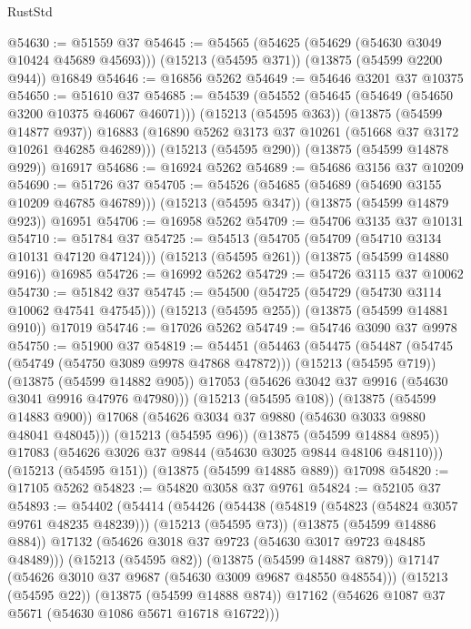 \begin{lexlean}{RustStd}
\begin{coremodule}
@54630 := @51559 @37
@54645 := @54565
    (@54625 (@54629 (@54630 @3049 @10424 @45689 @45693)))
    (@15213 (@54595 @371))
    (@13875 (@54599 @2200 @944))
    @16849
@54646 := @16856 @5262
@54649 := @54646 @3201 @37 @10375
@54650 := @51610 @37
@54685 := @54539
    (@54552
      (@54645 (@54649 (@54650 @3200 @10375 @46067 @46071)))
      (@15213 (@54595 @363))
      (@13875 (@54599 @14877 @937))
      @16883
      (@16890 @5262 @3173 @37 @10261 (@51668 @37 @3172 @10261 @46285 @46289)))
    (@15213 (@54595 @290))
    (@13875 (@54599 @14878 @929))
    @16917
@54686 := @16924 @5262
@54689 := @54686 @3156 @37 @10209
@54690 := @51726 @37
@54705 := @54526
    (@54685 (@54689 (@54690 @3155 @10209 @46785 @46789)))
    (@15213 (@54595 @347))
    (@13875 (@54599 @14879 @923))
    @16951
@54706 := @16958 @5262
@54709 := @54706 @3135 @37 @10131
@54710 := @51784 @37
@54725 := @54513
    (@54705 (@54709 (@54710 @3134 @10131 @47120 @47124)))
    (@15213 (@54595 @261))
    (@13875 (@54599 @14880 @916))
    @16985
@54726 := @16992 @5262
@54729 := @54726 @3115 @37 @10062
@54730 := @51842 @37
@54745 := @54500
    (@54725 (@54729 (@54730 @3114 @10062 @47541 @47545)))
    (@15213 (@54595 @255))
    (@13875 (@54599 @14881 @910))
    @17019
@54746 := @17026 @5262
@54749 := @54746 @3090 @37 @9978
@54750 := @51900 @37
@54819 := @54451
    (@54463
      (@54475
        (@54487
          (@54745 (@54749 (@54750 @3089 @9978 @47868 @47872)))
          (@15213 (@54595 @719))
          (@13875 (@54599 @14882 @905))
          @17053
          (@54626 @3042 @37 @9916 (@54630 @3041 @9916 @47976 @47980)))
        (@15213 (@54595 @108))
        (@13875 (@54599 @14883 @900))
        @17068
        (@54626 @3034 @37 @9880 (@54630 @3033 @9880 @48041 @48045)))
      (@15213 (@54595 @96))
      (@13875 (@54599 @14884 @895))
      @17083
      (@54626 @3026 @37 @9844 (@54630 @3025 @9844 @48106 @48110)))
    (@15213 (@54595 @151))
    (@13875 (@54599 @14885 @889))
    @17098
@54820 := @17105 @5262
@54823 := @54820 @3058 @37 @9761
@54824 := @52105 @37
@54893 := @54402
    (@54414
      (@54426
        (@54438
          (@54819 (@54823 (@54824 @3057 @9761 @48235 @48239)))
          (@15213 (@54595 @73))
          (@13875 (@54599 @14886 @884))
          @17132
          (@54626 @3018 @37 @9723 (@54630 @3017 @9723 @48485 @48489)))
        (@15213 (@54595 @82))
        (@13875 (@54599 @14887 @879))
        @17147
        (@54626 @3010 @37 @9687 (@54630 @3009 @9687 @48550 @48554)))
      (@15213 (@54595 @22))
      (@13875 (@54599 @14888 @874))
      @17162
      (@54626 @1087 @37 @5671 (@54630 @1086 @5671 @16718 @16722)))

\end{coremodule}
\end{lexlean}

